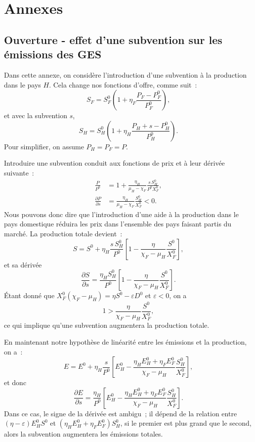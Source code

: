 \chapter{Annexes}

\section{Ouverture - effet d'une subvention sur les émissions des GES}\label{appendix:subventions}

Dans cette annexe, on considère l'introduction d'une subvention à la production dans le pays $H$. Cela change nos fonctions d'offre, comme suit~:
$$
    S_F = S_F^0\left(1 + \eta_F\frac{P_F - P_F^0}{P_F^0}\right),
$$
et avec la subvention $s$,
$$
    S_H = S_H^0\left(1 + \eta_H\frac{P_H + s - P_H^0}{P_H^0}\right).
$$
Pour simplifier, on assume $P_H = P_F = P$.

Introduire une subvention conduit aux fonctions de prix et à leur dérivée suivante~:
\begin{align*}
    \frac{P}{P^0}                 & = 1 + \frac{\eta_H}{\mu_H - \chi_F} \frac{s \, S_H^0}{P^0 X_F^0}, \\
    \frac{\partial P}{\partial s} & = \frac{\eta_H}{\mu_H - \chi_F} \frac{S_H^0}{X_F^0} < 0.
\end{align*}
Nous pouvons donc dire que l'introduction d'une aide à la production dans le pays domestique réduira les prix dans l'ensemble des pays faisant partis du marché.
La production totale devient~:
$$
    S = S^0 + \eta_H \frac{s \, S_H^0}{P^0}\left[1 - \frac{\eta}{\chi_F - \mu_H}\frac{S^0}{X_F^0}\right],
$$
et sa dérivée
$$
    \frac{\partial S}{\partial s} = \frac{\eta_H S_H^0}{P^0}\left[1 - \frac{\eta}{\chi_F - \mu_H}\frac{S^0}{X_F^0}\right].
$$
Étant donné que $X_F^0(\chi_F - \mu_H) = \eta S^0 - \varepsilon D^0$ et $\varepsilon < 0$, on a
$$
    1 > \frac{\eta}{\chi_F - \mu_H}\frac{S^0}{X_F^0},
$$
ce qui implique qu'une subvention augmentera la production totale.

En maintenant notre hypothèse de linéarité entre les émissions et la production, on a~:
$$
    E = E^0 + \eta_H \frac{s}{P^0}\left[E_H^0 - \frac{\eta_H E_H^0 + \eta_F E_F^0}{\chi_F - \mu_H}\frac{S_H^0}{X_F^0}\right],
$$
et donc
$$
    \frac{\partial E}{\partial s} = \frac{\eta_H}{P^0}\left[E_H^0 - \frac{\eta_H E_H^0 + \eta_F E_F^0}{\chi_F - \mu_H}\frac{S_H^0}{X_F^0}\right].
$$
Dans ce cas, le signe de la dérivée est ambigu~; il dépend de la relation entre $(\eta - \varepsilon)E_H^0 S^0$ et $(\eta_H E_H^0 + \eta_F E_F^0) S_H^0$, si le premier est plus grand que le second, alors la subvention augmentera les émissions totales.

